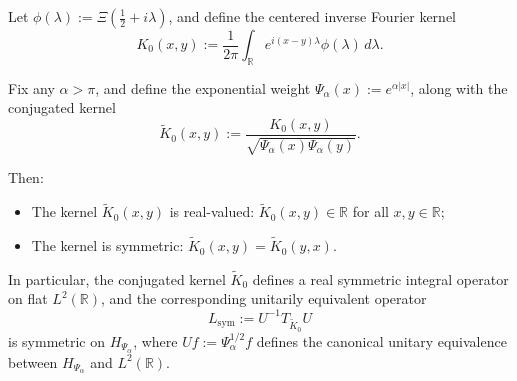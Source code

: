 \begin{lemma}
\label{lem:kernel-symmetry}
Let \( \phi(\lambda) := \Xi\left( \tfrac{1}{2} + i\lambda \right) \), and define the centered inverse Fourier kernel
\[
K_0(x,y) := \frac{1}{2\pi} \int_{\mathbb{R}} e^{i(x - y)\lambda} \phi(\lambda)\, d\lambda.
\]

Fix any \( \alpha > \pi \), and define the exponential weight \( \Psi_\alpha(x) := e^{\alpha |x|} \), along with the conjugated kernel
\[
\widetilde{K}_0(x,y) := \frac{K_0(x,y)}{\sqrt{\Psi_\alpha(x)\Psi_\alpha(y)}}.
\]

Then:
\begin{itemize}
    \item The kernel \( \widetilde{K}_0(x,y) \) is real-valued: \( \widetilde{K}_0(x,y) \in \mathbb{R} \) for all \( x, y \in \mathbb{R} \);
    \item The kernel is symmetric: \( \widetilde{K}_0(x,y) = \widetilde{K}_0(y,x) \).
\end{itemize}

\noindent
In particular, the conjugated kernel \( \widetilde{K}_0 \) defines a real symmetric integral operator on flat \( L^2(\mathbb{R}) \), and the corresponding unitarily equivalent operator
\[
L_{\mathrm{sym}} := U^{-1} T_{\widetilde{K}_0} U
\]
is symmetric on \( H_{\Psi_\alpha} \), where \( U f := \Psi_\alpha^{1/2} f \) defines the canonical unitary equivalence between \( H_{\Psi_\alpha} \) and \( L^2(\mathbb{R}) \).
\end{lemma}
